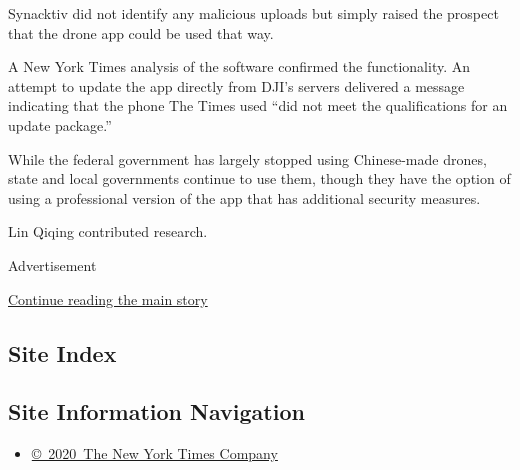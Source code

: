 Synacktiv did not identify any malicious uploads but simply raised the
prospect that the drone app could be used that way.

A New York Times analysis of the software confirmed the functionality.
An attempt to update the app directly from DJI's servers delivered a
message indicating that the phone The Times used ``did not meet the
qualifications for an update package.''

While the federal government has largely stopped using Chinese-made
drones, state and local governments continue to use them, though they
have the option of using a professional version of the app that has
additional security measures.

Lin Qiqing contributed research.

Advertisement

\protect\hyperlink{after-bottom}{Continue reading the main story}

\hypertarget{site-index}{%
\subsection{Site Index}\label{site-index}}

\hypertarget{site-information-navigation}{%
\subsection{Site Information
Navigation}\label{site-information-navigation}}

\begin{itemize}
\tightlist
\item
  \href{https://help.nytimes3xbfgragh.onion/hc/en-us/articles/115014792127-Copyright-notice}{©~2020~The
  New York Times Company}
\end{itemize}

